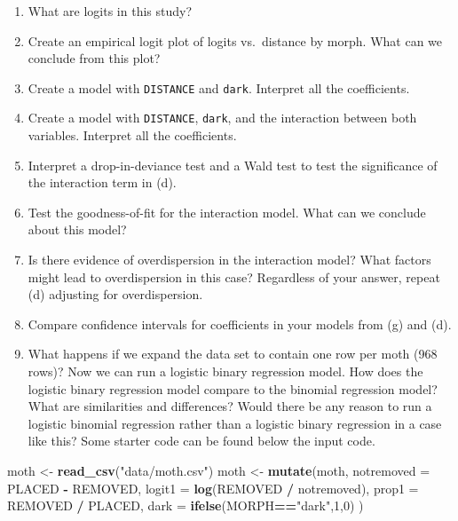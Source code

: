 \documentclass[
]{krantz}
\newenvironment{Shaded}{\begin{snugshade}}{\end{snugshade}}
\newcommand{\AttributeTok}[1]{\textcolor[rgb]{0.27,0.27,0.27}{#1}}
\newcommand{\DecValTok}[1]{\textcolor[rgb]{0.06,0.06,0.06}{#1}}
\newcommand{\FunctionTok}[1]{\textcolor[rgb]{0.27,0.27,0.27}{\textbf{#1}}}
\newcommand{\NormalTok}[1]{#1}
\newcommand{\OtherTok}[1]{\textcolor[rgb]{0.37,0.37,0.37}{#1}}
\newcommand{\SpecialCharTok}[1]{\textcolor[rgb]{0.43,0.43,0.43}{\textbf{#1}}}
\newcommand{\StringTok}[1]{\textcolor[rgb]{0.5,0.5,0.5}{#1}}
\providecommand{\tightlist}{%
  \setlength{\itemsep}{0pt}\setlength{\parskip}{0pt}}
\begin{document}
\begin{enumerate}
  \begin{enumerate}
  \def\labelenumii{\alph{enumii}.}
  \tightlist
  \item
    What are logits in this study?
  \item
    Create an empirical logit plot of logits vs.~distance by morph. What can we conclude from this plot?
  \item
    Create a model with \texttt{DISTANCE} and \texttt{dark}. Interpret all the coefficients.
  \item
    Create a model with \texttt{DISTANCE}, \texttt{dark}, and the interaction between both variables. Interpret all the coefficients.
  \item
    Interpret a drop-in-deviance test and a Wald test to test the significance of the interaction term in (d).
  \item
    Test the goodness-of-fit for the interaction model. What can we conclude about this model?
  \item
    Is there evidence of overdispersion in the interaction model? What factors might lead to overdispersion in this case? Regardless of your answer, repeat (d) adjusting for overdispersion.
  \item
    Compare confidence intervals for coefficients in your models from (g) and (d).
  \item
    What happens if we expand the data set to contain one row per moth (968 rows)? Now we can run a logistic binary regression model. How does the logistic binary regression model compare to the binomial regression model? What are similarities and differences? Would there be any reason to run a logistic binomial regression rather than a logistic binary regression in a case like this? Some starter code can be found below the input code.
  \end{enumerate}
\end{enumerate}

\begin{Shaded}
\begin{Highlighting}[]
\NormalTok{moth }\OtherTok{\textless{}{-}} \FunctionTok{read\_csv}\NormalTok{(}\StringTok{"data/moth.csv"}\NormalTok{)}
\NormalTok{moth }\OtherTok{\textless{}{-}} \FunctionTok{mutate}\NormalTok{(moth, }
               \AttributeTok{notremoved =}\NormalTok{ PLACED }\SpecialCharTok{{-}}\NormalTok{ REMOVED, }
               \AttributeTok{logit1 =} \FunctionTok{log}\NormalTok{(REMOVED }\SpecialCharTok{/}\NormalTok{ notremoved),}
               \AttributeTok{prop1 =}\NormalTok{ REMOVED }\SpecialCharTok{/}\NormalTok{ PLACED, }
               \AttributeTok{dark =} \FunctionTok{ifelse}\NormalTok{(MORPH}\SpecialCharTok{==}\StringTok{"dark"}\NormalTok{,}\DecValTok{1}\NormalTok{,}\DecValTok{0}\NormalTok{) )}
\end{Highlighting}
\end{Shaded}
\end{document}
